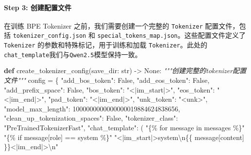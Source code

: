\documentclass[
]{article}
\newenvironment{Shaded}{}{}
\newcommand{\BuiltInTok}[1]{\textcolor[rgb]{0.00,0.50,0.00}{#1}}
\newcommand{\CharTok}[1]{\textcolor[rgb]{0.25,0.44,0.63}{#1}}
\newcommand{\CommentTok}[1]{\textcolor[rgb]{0.38,0.63,0.69}{\textit{#1}}}
\newcommand{\DecValTok}[1]{\textcolor[rgb]{0.25,0.63,0.44}{#1}}
\newcommand{\KeywordTok}[1]{\textcolor[rgb]{0.00,0.44,0.13}{\textbf{#1}}}
\newcommand{\NormalTok}[1]{#1}
\newcommand{\OperatorTok}[1]{\textcolor[rgb]{0.40,0.40,0.40}{#1}}
\newcommand{\SpecialCharTok}[1]{\textcolor[rgb]{0.25,0.44,0.63}{#1}}
\newcommand{\StringTok}[1]{\textcolor[rgb]{0.25,0.44,0.63}{#1}}
\newcommand{\VariableTok}[1]{\textcolor[rgb]{0.10,0.09,0.49}{#1}}
\begin{document}
\paragraph{Step 3:
创建配置文件}\label{step-3-ux521bux5efaux914dux7f6eux6587ux4ef6}

在训练 BPE Tokenizer 之前，我们需要创建一个完整的 \texttt{Tokenizer}
配置文件，包括 \texttt{tokenizer\_config.json} 和
\texttt{special\_tokens\_map.json}。这些配置文件定义了
\texttt{Tokenizer} 的参数和特殊标记，用于训练和加载
\texttt{Tokenizer}。此处的\texttt{chat\_template}我们与\texttt{Qwen2.5}模型保持一致。

\begin{Shaded}
\begin{Highlighting}[]
\KeywordTok{def}\NormalTok{ create\_tokenizer\_config(save\_dir: }\BuiltInTok{str}\NormalTok{) }\OperatorTok{{-}\textgreater{}} \VariableTok{None}\NormalTok{:}
    \CommentTok{"""创建完整的tokenizer配置文件"""}
\NormalTok{    config }\OperatorTok{=}\NormalTok{ \{}
        \StringTok{"add\_bos\_token"}\NormalTok{: }\VariableTok{False}\NormalTok{,}
        \StringTok{"add\_eos\_token"}\NormalTok{: }\VariableTok{False}\NormalTok{,}
        \StringTok{"add\_prefix\_space"}\NormalTok{: }\VariableTok{False}\NormalTok{,}
        \StringTok{"bos\_token"}\NormalTok{: }\StringTok{"\textless{}|im\_start|\textgreater{}"}\NormalTok{,}
        \StringTok{"eos\_token"}\NormalTok{: }\StringTok{"\textless{}|im\_end|\textgreater{}"}\NormalTok{,}
        \StringTok{"pad\_token"}\NormalTok{: }\StringTok{"\textless{}|im\_end|\textgreater{}"}\NormalTok{,}
        \StringTok{"unk\_token"}\NormalTok{: }\StringTok{"\textless{}unk\textgreater{}"}\NormalTok{,}
        \StringTok{"model\_max\_length"}\NormalTok{: }\DecValTok{1000000000000000019884624838656}\NormalTok{,}
        \StringTok{"clean\_up\_tokenization\_spaces"}\NormalTok{: }\VariableTok{False}\NormalTok{,}
        \StringTok{"tokenizer\_class"}\NormalTok{: }\StringTok{"PreTrainedTokenizerFast"}\NormalTok{,}
        \StringTok{"chat\_template"}\NormalTok{: (}
            \StringTok{"\{}\SpecialCharTok{\% f}\StringTok{or message in messages \%\}"}
            \StringTok{"\{}\SpecialCharTok{\% i}\StringTok{f message[\textquotesingle{}role\textquotesingle{}] == \textquotesingle{}system\textquotesingle{} \%\}"}
            \StringTok{"\textless{}|im\_start|\textgreater{}system}\CharTok{\textbackslash{}n}\SpecialCharTok{\{\{}\StringTok{ message[\textquotesingle{}content\textquotesingle{}] }\SpecialCharTok{\}\}}\StringTok{\textless{}|im\_end|\textgreater{}}\CharTok{\textbackslash{}n}\StringTok{"}

\end{Highlighting}
\end{Shaded}
\end{document}
